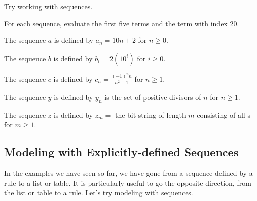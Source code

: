 Try working with sequences.  

\begin{act}
\label{act_eval_seq}
    For each sequence, evaluate the first five terms and the term with index $20$.
        \begin{actpart}
            \item The sequence $a$ is defined by $a_n=10n + 2$ for $n \ge 0$.
            \item The sequence $b$ is defined by $b_i = 2(10^i)$ for $i \ge 0$.        
            \item The sequence $c$ is defined by $c_n = \frac{(-1)^nn}{n^2+1}$ for $n \ge 1$.    
            \item The sequence $y$ is defined by $y_n$ is the set of positive divisors of $n$ for $n \ge 1$.
            \item The sequence $z$ is defined by $z_m=$ the bit string of length $m$ consisting of all s for $m \ge 1$.
        \end{actpart}
\end{act}

\newcommand{\submodelseq}{Modeling with Explicitly-defined Sequences}
\subsection{\submodelseq}
\label{sub_model_seq}

In the examples we have seen so far, we have gone from a sequence defined by a rule to a list or table.  It is particularly useful to go the opposite direction, from the list or table to a rule.  Let's try modeling with sequences.

